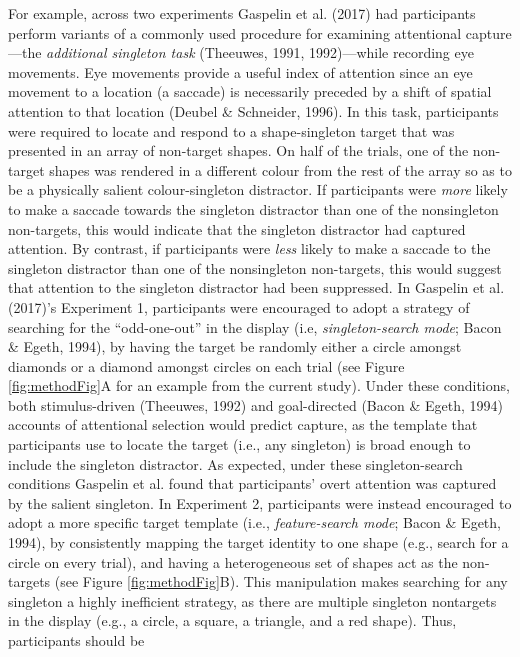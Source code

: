 \documentclass[man, a4paper, noextraspace, 11pt,floatsintext]{apa6}
\theoremstyle{definition}
\theoremstyle{definition}
\theoremstyle{definition}
\theoremstyle{remark}
\begin{document}
For example, across two experiments Gaspelin et al. (2017) had
participants perform variants of a commonly used procedure for examining
attentional capture---the \emph{additional singleton task} (Theeuwes,
1991, 1992)---while recording eye movements. Eye movements provide a
useful index of attention since an eye movement to a location (a
saccade) is necessarily preceded by a shift of spatial attention to that
location (Deubel \& Schneider, 1996). In this task, participants were
required to locate and respond to a shape-singleton target that was
presented in an array of non-target shapes. On half of the trials, one
of the non-target shapes was rendered in a different colour from the
rest of the array so as to be a physically salient colour-singleton
distractor. If participants were \emph{more} likely to make a saccade
towards the singleton distractor than one of the nonsingleton
non-targets, this would indicate that the singleton distractor had
captured attention. By contrast, if participants were \emph{less} likely
to make a saccade to the singleton distractor than one of the
nonsingleton non-targets, this would suggest that attention to the
singleton distractor had been suppressed. In Gaspelin et al. (2017)'s
Experiment 1, participants were encouraged to adopt a strategy of
searching for the \enquote{odd-one-out} in the display (i.e,
\emph{singleton-search mode}; Bacon \& Egeth, 1994), by having the
target be randomly either a circle amongst diamonds or a diamond amongst
circles on each trial (see Figure \ref{fig:methodFig}A for an example
from the current study). Under these conditions, both stimulus-driven
(Theeuwes, 1992) and goal-directed (Bacon \& Egeth, 1994) accounts of
attentional selection would predict capture, as the template that
participants use to locate the target (i.e., any singleton) is broad
enough to include the singleton distractor. As expected, under these
singleton-search conditions Gaspelin et al. found that participants'
overt attention was captured by the salient singleton. In Experiment 2,
participants were instead encouraged to adopt a more specific target
template (i.e., \emph{feature-search mode}; Bacon \& Egeth, 1994), by
consistently mapping the target identity to one shape (e.g., search for
a circle on every trial), and having a heterogeneous set of shapes act
as the non-targets (see Figure \ref{fig:methodFig}B). This manipulation
makes searching for any singleton a highly inefficient strategy, as
there are multiple singleton nontargets in the display (e.g., a circle,
a square, a triangle, and a red shape). Thus, participants should be
\end{document}
